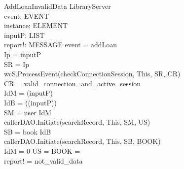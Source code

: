 \begin{schema}{AddLoanInvalidData}
\Delta LibraryServer \\
event: EVENT \\
instance: ELEMENT \\
inputP: LIST \\
report!: MESSAGE
\where event = addLoan \\
Ip = \head inputP \\
SR = \lseq Ip \rseq \\ 
wcS.ProcessEvent(checkConnectionSession, This, SR, CR) \\
CR = valid\_connection\_and\_active\_session \\
IdM = \head (\tail inputP) \\
IdB = \head (\tail (\tail inputP)) \\
SM = \lseq user IdM \rseq \\
callerDAO.Initiate(searchRecord, This, SM, US) \\
SB = \lseq book IdB \rseq \\
callerDAO.Initiate(searchRecord, This, SB, BOOK) \\
IdM = 0 \lor US = \emptyset \lor BOOK = \emptyset \\ 
report! = not\_valid\_data
\end{schema}


